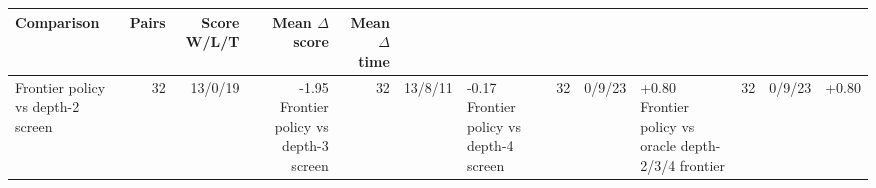 \begin{tabular}{lrrrr}
\toprule
Comparison & Pairs & Score W/L/T & Mean $\Delta$ score & Mean $\Delta$ time \\
\midrule
Frontier policy vs depth-2 screen & 32 & 13/0/19 & -1.95%
Frontier policy vs depth-3 screen & 32 & 13/8/11 & -0.17%
Frontier policy vs depth-4 screen & 32 & 0/9/23 & +0.80%
Frontier policy vs oracle depth-2/3/4 frontier & 32 & 0/9/23 & +0.80%
\bottomrule
\end{tabular}
